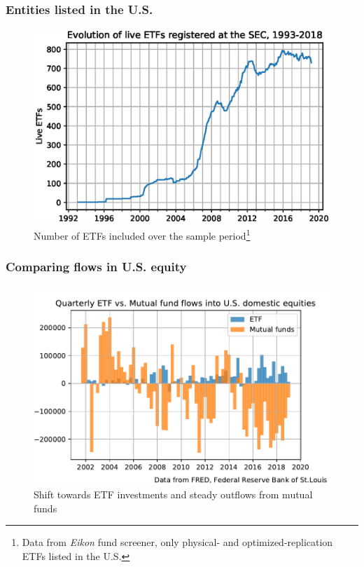 \documentclass[9pt, usenames, dvipsnames]{beamer}
\begin{document}
\begin{frame}
  \frametitle{Entities listed in the U.S.}
  \begin{figure}
    \centering
    \caption{Number of ETFs included over the sample period\footnote{Data from \emph{Eikon} fund screener, only physical- and optimized-replication ETFs listed in the U.S.}}
    \includegraphics[width = \textwidth, height = 0.65\paperheight, keepaspectratio]{LiveETF_Eikon}
  \end{figure}
\end{frame}

\begin{frame}
  \frametitle{Comparing flows in U.S. equity}
  \begin{figure}
    \centering
    \caption{Shift towards ETF investments and steady outflows from mutual funds}
    \includegraphics[width = \textwidth, height = 0.65\paperheight, keepaspectratio]{USFlows_ETFvsMutual.pdf}
  \end{figure}
\end{frame}
\end{document}
